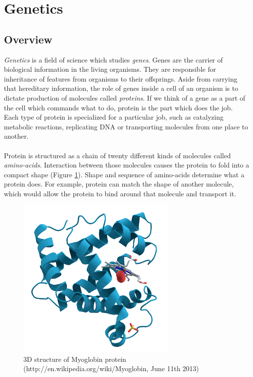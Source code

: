 \documentclass[times, utf8, diplomski]{fer}
\begin{document}
\section{Genetics}
\subsection{Overview}

\emph{Genetics} is a field of science which studies \emph{genes}. Genes are the carrier of biological information in the living organisms. They are responsible for inheritance of features from organisms to their offsprings. Aside from carrying that hereditary information, the role of genes inside a cell of an organism is to dictate production of molecules called \emph{proteins}. If we think of a gene as a part of the cell which commands what to do, protein is the part which does the job. Each type of protein is specialized for a particular job, such as catalyzing metabolic reactions, replicating  DNA or transporting molecules from one place to another.
\\
\\
Protein is structured as a chain of twenty different kinds of molecules called \emph{amino-acids}. Interaction between those molecules causes the protein to fold into a compact shape (Figure \ref{myoglobin}). Shape and sequence of amino-acids determine what a protein does. For example, protein can match the shape of another molecule, which would allow the protein to bind around that molecule and transport it.

\begin{figure}[!ht]
\begin{center}
	\includegraphics[width=0.7\textwidth]{../img/Myoglobin.png}
	\caption{3D structure of Myoglobin protein (http://en.wikipedia.org/wiki/Myoglobin, June 11th 2013)}\label{myoglobin}
\end{center}
\end{figure}
\end{document}

